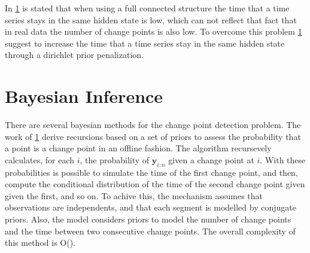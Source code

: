 In \ref{} is stated that when using a full connected structure the time that a time series stays in the same hidden state is low, which can not reflect that fact that in real data the number of change points is also low. To overcome this problem \ref{} suggest to increase the time that a time series stay in the same hidden state through a dirichlet prior penalization.

\section{Bayesian Inference}

There are several bayesian methods for the change point detection problem. The work of \ref{} derive recursions based on a set of priors to assess the probability that a point is a change point in an offline fashion. The algorithm recursevely calculates, for each $i$, the probability of $\mathbf{y}_{i : n}$ given a change point at $i$. With these probabilities is possible to simulate the time of the first change point, and then, compute the conditional distribution of the time of the second change point given given the first, and so on. To achive this, the mechanism assumes that observations are independents, and that each segment is modelled by conjugate priors. Also, the model considers priors to model the number of change points and the time between two consecutive change points. The overall complexity of this method is O().




